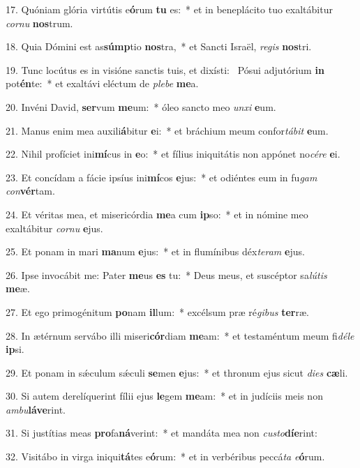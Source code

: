 17. Quóniam glória virtútis e\textbf{ó}rum \textbf{tu} es:~*  et in beneplácito tuo exaltábitur \textit{cor}\textit{nu} \textbf{nos}trum.\

18. Quia Dómini est as\textbf{súmp}tio \textbf{nos}tra,~*  et Sancti Israël, \textit{re}\textit{gis} \textbf{nos}tri.\

19. Tunc locútus es in visióne sanctis tuis, et dixísti: \dag\  Pósui adjutórium \textbf{in} pot\textbf{én}te:~*  et exaltávi eléctum de \textit{ple}\textit{be} \textbf{me}a.\

20. Invéni David, \textbf{ser}vum \textbf{me}um:~*  óleo sancto meo \textit{un}\textit{xi} \textbf{e}um.\

21. Manus enim mea auxili\textbf{á}bitur \textbf{e}i:~*  et bráchium meum confor\textit{tá}\textit{bit} \textbf{e}um.\

22. Nihil profíciet ini\textbf{mí}cus in \textbf{e}o:~*  et fílius iniquitátis non appónet no\textit{cé}\textit{re} \textbf{e}i.\

23. Et concídam a fácie ipsíus ini\textbf{mí}cos \textbf{e}jus:~*  et odiéntes eum in fu\textit{gam} \textit{con}\textbf{vér}tam.\

24. Et véritas mea, et misericórdia \textbf{me}a cum \textbf{ip}so:~*  et in nómine meo exaltábitur \textit{cor}\textit{nu} \textbf{e}jus.\

25. Et ponam in mari \textbf{ma}num \textbf{e}jus:~*  et in flumínibus déx\textit{te}\textit{ram} \textbf{e}jus.\

26. Ipse invocábit me: Pater \textbf{me}us \textbf{es} tu:~*  Deus meus, et suscéptor sa\textit{lú}\textit{tis} \textbf{me}æ.\

27. Et ego primogénitum \textbf{po}nam \textbf{il}lum:~*  excélsum præ ré\textit{gi}\textit{bus} \textbf{ter}ræ.\

28. In ætérnum servábo illi miseri\textbf{cór}diam \textbf{me}am:~*  et testaméntum meum fi\textit{dé}\textit{le} \textbf{ip}si.\

29. Et ponam in sǽculum sǽculi \textbf{se}men \textbf{e}jus:~*  et thronum ejus sicut \textit{di}\textit{es} \textbf{cæ}li.\

30. Si autem derelíquerint fílii ejus \textbf{le}gem \textbf{me}am:~*  et in judíciis meis non \textit{am}\textit{bu}\textbf{lá}\textbf{ve}rint.\

31. Si justítias meas \textbf{pro}fa\textbf{ná}verint:~*  et mandáta mea non \textit{cus}\textit{to}\textbf{dí}\textbf{e}rint:\

32. Visitábo in virga iniqui\textbf{tá}tes e\textbf{ó}rum:~*  et in verbéribus peccá\textit{ta} \textit{e}\textbf{ó}rum.\

